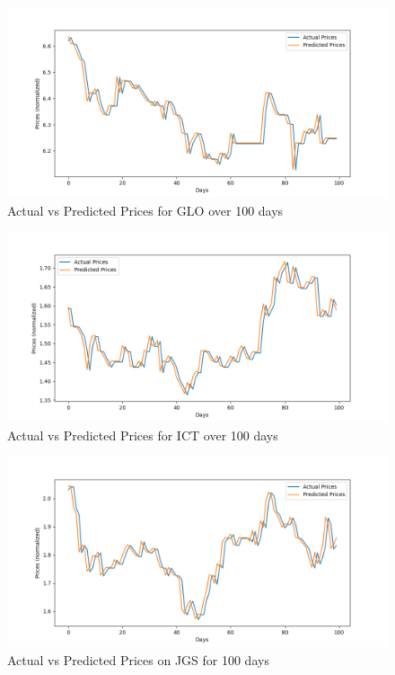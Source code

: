 \begin{figure}[ht]
    \centering
    \includegraphics[width=1\textwidth]{./assets/Chapter_4/DMD_LSTM_crossval/100days/GLO.png}
    \caption{Actual vs Predicted Prices for GLO over 100 days}
    \label{fig:crossval100_GLO}
\end{figure}
\FloatBarrier

\begin{figure}[ht]
    \centering
    \includegraphics[width=1\textwidth]{./assets/Chapter_4/DMD_LSTM_crossval/100days/ICT.png}
    \caption{Actual vs Predicted Prices for ICT over 100 days}
    \label{fig:crossval100_ICT}
\end{figure}
\FloatBarrier

\begin{figure}[ht]
    \centering
    \includegraphics[width=1\textwidth]{./assets/Chapter_4/DMD_LSTM_crossval/100days/JGS.png}
    \caption{Actual vs Predicted Prices on JGS for 100 days}
    \label{fig:crossval100_JGS}
\end{figure}
\FloatBarrier
    
